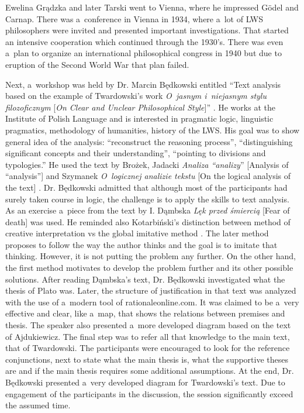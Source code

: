 \begin{editorialeng}{Ewelina Grądzka}
and later Tarski went to Vienna, where he impressed Gödel and Carnap. There was a~conference in Vienna in 1934, where a~lot of LWS philosophers were invited and presented important investigations. That started an intensive cooperation which continued through the 1930’s. There was even a~plan to organize an international philosophical congress in 1940 but due to eruption of the Second World War that plan failed.

Next, a~workshop was held by Dr. Marcin Będkowski entitled ``Text analysis based on the example of Twardowski’s work \textit{O~jasnym i~niejasnym stylu filozoficznym} [\textit{On Clear and Unclear Philosophical Style}]''
\parencites[cf.][]{twardowski_o_1927}[eng. transl.][]{brandl_clear_1999}. %
 He works at the Institute of Polish Language and is interested in pragmatic logic, linguistic pragmatics, methodology of humanities, history of the LWS. His goal was to show general idea of the analysis: ``reconstruct the reasoning process'', ``distinguishing significant concepts and their understanding'', ``pointing to divisions and typologies.'' He used the text by Brożek, Jadacki \textit{Analiza ``analizy}'' [Analysis of ``analysis''] 
\parencite*[][]{brozek_analiza_2006} %
 and Szymanek \textit{O~logicznej analizie tekstu} [On the logical analysis of the text] 
\parencite*[][]{szymanek_o_2010}. %
 Dr. Będkowski admitted that although most of the participants had surely taken course in logic, the challenge is to apply the skills to text analysis. As an exercise a~piece from the text by I. Dąmbska \textit{Lęk przed śmiercią} [Fear of death] was used. He reminded also Kotarbiński’s distinction between method of creative interpretation vs the global imitative method 
\parencite[cf.][]{kotarbinski_praxiology_1965}. %
 The later method proposes to follow the way the author thinks and the goal is to imitate that thinking. However, it is not putting the problem any further. On the other hand, the first method motivates to develop the problem further and its other possible solutions. After reading Dąmbska’s text, Dr. Będkowski investigated what the thesis of Plato was. Later, the structure of justification in that text was analyzed with the use of a~modern tool of rationaleonline.com. It was claimed to be a~very effective and clear, like a~map, that shows the relations between premises and thesis. The speaker also presented a~more developed diagram based on the text of Ajdukiewicz. The final step was to refer all that knowledge to the main text, that of Twardowski. The participants were encouraged to look for the reference conjunctions, next to state what the main thesis is, what the supportive theses are and if the main thesis requires some additional assumptions. At the end, Dr. Będkowski presented a~very developed diagram for Twardowski’s text. Due to engagement of the participants in the discussion, the session significantly exceed the assumed time.


\end{editorialeng}
